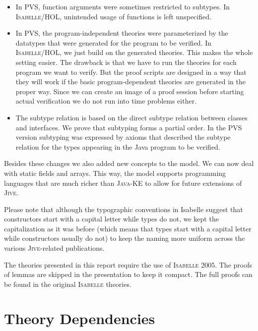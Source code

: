 \documentclass[11pt,a4paper,twoside]{article}
\renewcommand{\jive}{\textsc{Jive}\xspace}
\newcommand{\isabelleP}{\textsc{Isabelle}\xspace}
\newcommand{\isabelleH}{\textsc{Isabelle/HOL}\xspace}
\newcommand{\javake}{\textsc{Java-KE}\xspace}
\begin{document}
\begin{itemize}
\item In PVS, function arguments were sometimes restricted to subtypes. In \isabelleH,
  unintended usage of functions is left unspecified.

\item In PVS, the program-independent theories were parameterized by the datatypes that were
  generated for the program to be verified. In \isabelleH, we just build on the generated theories. This makes
  the whole setting easier. The drawback is that we have to run the theories
  for each program we want to verify. But the proof scripts are designed in a
  way that they will work if the basic program-dependent theories are generated in the proper
  way. Since we can create an image of a proof session before starting actual
  verification we do not run into time problems either.

\item The subtype relation is based on the direct subtype 
 relation between classes and interfaces. We prove that subtyping forms a partial order. In
  the PVS version subtyping was expressed by axioms that described the subtype relation
  for the types appearing in the Java program to be verified.
\end{itemize}

Besides these changes we also added new concepts to the model. We can
now deal with static fields and arrays. This way, the model supports programming languages that are much richer
than \javake to allow for future extensions of \jive.

Please note that although the typographic conventions in Isabelle
suggest that constructors start with a capital letter while types do
not, we kept the capitalization as it was before (which means that
types start with a capital letter while constructors usually do not)
to keep the naming more uniform across the various \jive-related publications.

The theories presented in this report require the use of \isabelleP 2005. The proofs of lemmas are skipped 
in the presentation to keep it compact.
The full proofs can be found in the original \isabelleP theories. 

\clearpage

\section{Theory Dependencies}
\end{document}
